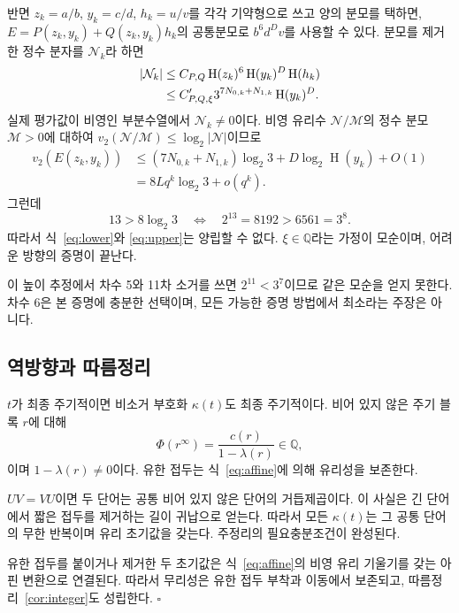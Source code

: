 \documentclass[11pt,a4paper]{article}
\theoremstyle{koreanplain}
\newcommand{\Q}{\mathbb Q}
\newcommand{\vTwo}{v_2}
\newcommand{\htQ}{\operatorname{H}}
\begin{document}
반면 $z_k=a/b$, $y_k=c/d$, $h_k=u/v$를 각각 기약형으로 쓰고 양의 분모를 택하면, $E=P(z_k,y_k)+Q(z_k,y_k)h_k$의 공통분모로 $b^6d^Dv$를 사용할 수 있다. 분모를 제거한 정수 분자를 $\mathcal N_k$라 하면
\begin{align}
|\mathcal N_k|
&\le C_{P,Q}\htQ(z_k)^6\htQ(y_k)^D\htQ(h_k)\notag\\
&\le C'_{P,Q,\xi}3^{7N_{0,k}+N_{1,k}}\htQ(y_k)^D.\label{eq:numheight}
\end{align}
실제 평가값이 비영인 부분수열에서 $\mathcal N_k\ne0$이다. 비영 유리수 $\mathcal N/\mathcal M$의 정수 분모 $\mathcal M>0$에 대하여
$\vTwo(\mathcal N/\mathcal M)\le\log_2|\mathcal N|$이므로
\begin{equation}\label{eq:upper}
\begin{split}
\vTwo(E(z_k,y_k))
&\le (7N_{0,k}+N_{1,k})\log_2 3
 +D\log_2\htQ(y_k)+O(1)\\
&=8Lq^k\log_2 3+o(q^k).
\end{split}
\end{equation}
그런데
\begin{equation}\label{eq:gap}
13>8\log_2 3
\quad\Longleftrightarrow\quad
2^{13}=8192>6561=3^8.
\end{equation}
따라서 식~\eqref{eq:lower}와 \eqref{eq:upper}는 양립할 수 없다. $\xi\in\Q$라는 가정이 모순이며, 어려운 방향의 증명이 끝난다.

이 높이 추정에서 차수 5와 11차 소거를 쓰면 $2^{11}<3^7$이므로 같은 모순을 얻지 못한다. 차수 6은 본 증명에 충분한 선택이며, 모든 가능한 증명 방법에서 최소라는 주장은 아니다.

\subsection{역방향과 따름정리}

$t$가 최종 주기적이면 비소거 부호화 $\kappa(t)$도 최종 주기적이다. 비어 있지 않은 주기 블록 $r$에 대해
\[
\Phi(r^\infty)=\frac{c(r)}{1-\lambda(r)}\in\Q,
\]
이며 $1-\lambda(r)\ne0$이다. 유한 접두는 식~\eqref{eq:affine}에 의해 유리성을 보존한다.

$UV=VU$이면 두 단어는 공통 비어 있지 않은 단어의 거듭제곱이다. 이 사실은 긴 단어에서 짧은 접두를 제거하는 길이 귀납으로 얻는다. 따라서 모든 $\kappa(t)$는 그 공통 단어의 무한 반복이며 유리 초기값을 갖는다. 주정리의 필요충분조건이 완성된다.

유한 접두를 붙이거나 제거한 두 초기값은 식~\eqref{eq:affine}의 비영 유리 기울기를 갖는 아핀 변환으로 연결된다. 따라서 무리성은 유한 접두 부착과 이동에서 보존되고, 따름정리~\ref{cor:integer}도 성립한다. \hfill$\square$
\end{document}
